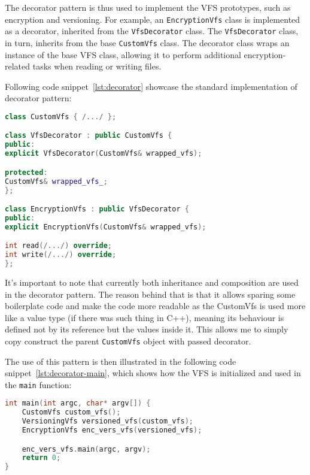 The decorator pattern is thus used to implement the VFS prototypes, such as encryption and versioning.
For example, an \texttt{EncryptionVfs} class is implemented as a decorator, inherited from the \texttt{VfsDecorator} class.
The \texttt{VfsDecorator} class, in turn, inherits from the base \texttt{CustomVfs} class.
The decorator class wraps an instance of the base VFS class, allowing it to perform additional encryption-related tasks when reading or writing files.

Following code snippet~\ref{lst:decorator} showcase the standard implementation of decorator pattern:

\begin{lstlisting}[language=c++, caption={Decorator pattern implementation},label={lst:decorator},basicstyle=\ttfamily\small]
class CustomVfs { /.../ };

class VfsDecorator : public CustomVfs {
public:
explicit VfsDecorator(CustomVfs& wrapped_vfs);

protected:
CustomVfs& wrapped_vfs_;
};

class EncryptionVfs : public VfsDecorator {
public:
explicit EncryptionVfs(CustomVfs& wrapped_vfs);

int read(/.../) override;
int write(/.../) override;
};
\end{lstlisting}

It's important to note that currently both inheritance and composition are used in the decorator pattern.
The reason behind that is that it allows sparing some boilerplate code and make the code more readable as the CustomVfs is used more like a value type (if there was such thing in C++), meaning its behaviour is defined not by its reference but the values inside it.
This allows me to simply copy construct the parent \texttt{CustomVfs} object with passed decorator.

The use of this pattern is then illustrated in the following code snippet~\ref{lst:decorator-main}, which shows how the VFS is initialized and used in the \texttt{main} function:

\begin{lstlisting}[language=c++, caption={VFS initialization and usage},label={lst:decorator-main}, basicstyle=\ttfamily\small]
int main(int argc, char* argv[]) {
    CustomVfs custom_vfs();
    VersioningVfs versioned_vfs(custom_vfs);
    EncryptionVfs enc_vers_vfs(versioned_vfs);

    enc_vers_vfs.main(argc, argv);
    return 0;
}
\end{lstlisting}

